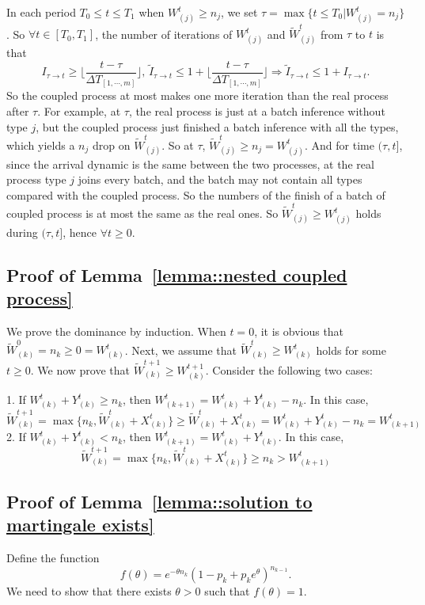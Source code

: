 In each period $T_0\leq t\leq T_1$ when $W^t_{(j)}\geq n_j$, we set $\tau = \max\{t\leq T_0|W^t_{(j)} = n_j \}$. So $\forall t\in [T_0, T_1]$, the number of iterations of $W^t_{(j)}$ and $\tilde{W}^t_{(j)}$ from $\tau$ to $t$ is that
$$I_{\tau\to t} \geq \lfloor\frac{t-\tau}{\Delta T_{[1,\cdots,m]}}\rfloor ,\,\tilde{I}_{\tau\to t}\leq 1+\lfloor\frac{t-\tau}{\Delta T_{[1,\cdots,m]}}\rfloor \Rightarrow \tilde{I}_{\tau\to t}\leq 1+I_{\tau\to t}.$$
So the coupled process at most makes one more iteration than the real process after $\tau$. For example, at $\tau$, the real process is  just at a batch inference without type $j$, but the coupled process just finished a batch inference with all the types, which yields a $n_j$ drop on $\tilde{W}_{(j)}^t$. So at $\tau$, $\tilde{W}_{(j)}^t\geq n_j = W_{(j)}^t$. And for time $(\tau,t]$, since the arrival dynamic is the same between the two processes,  at the real process type $j$ joins every batch, and the batch may not contain all types compared with the coupled process. So the numbers of the finish of a batch of coupled process is at most the same as the real ones. So $\tilde{W}^t_{(j )}\geq W^t_{(j )}$ holds during $(\tau, t]$, hence $\forall t\geq 0$. 

\subsection{Proof of Lemma~\ref{lemma::nested coupled process}}\label{appendix_lemma::proof of nested coupled process}
We prove the dominance by induction. When $t = 0$, it is obvious that $ \tilde{W}_{(k)}^0 = n_{k}\geq 0=W_{(k)}^t $. Next, we assume that $\tilde{W}^t_{(k)}\geq W^t_{(k)}  $ holds for some $t\geq 0$. We now prove that $\tilde{W}^{t+1}_{(k)}\geq W^{t+1}_{(k)}  $. Consider the following two cases:

1. If $ W^t_{(k)}+ Y^t_{(k)}\geq n_k $, then $W^t_{(k+1)}= W^{t}_{(k)}+Y^t_{(k)}  -  n_k $. In this case, 
$$ \tilde{W}^{t+1}_{(k)}=  \max\{ n_{k},\tilde{W}^{t}_{(k)} + X^t_{(k)}\} \geq \tilde{W}^{t}_{(k)} + X^t_{(k)}={W}^{t}_{(k)} + Y^t_{(k)}-n_k=W^t_{(k+1)}$$
2. If $ W^t_{(k)}+ Y^t_{(k)}<n_k $, then $W^t_{(k+1)}= W^{t}_{(k)}+Y^t_{(k)}$. In this case, 
$$\tilde{W}^{t+1}_{(k)}=  \max\{ n_{k},\tilde{W}^{t}_{(k)} + X^t_{(k)}\} \geq n_{k}> W^t_{(k+1)}$$

\subsection{Proof of Lemma~\ref{lemma::solution to martingale exists}}\label{appendix_lemma::proof of solution to martingale exists}
Define the function
\[
f(\theta) = e^{-\theta n_{k}} (1 - p_k + p_k e^{\theta})^{n_{k-1}}.
\]
We need to show that there exists \(\theta > 0\) such that \(f(\theta) = 1\).

